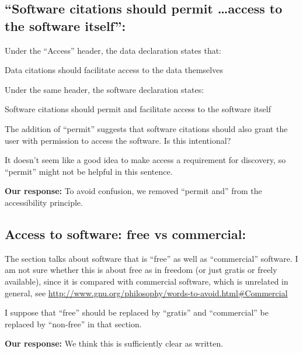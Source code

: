 \documentclass[12pt, oneside]{amsart}
\begin{document}
\subsection{``Software citations should permit \ldots access to the software itself'':} Under the ``Access'' header, the data declaration states that:

\begin{displayquote}
    Data citations should facilitate access to the data themselves
\end{displayquote}

Under the same header, the software declaration states:

\begin{displayquote}
    Software citations should permit and facilitate access to the software itself
\end{displayquote}

The addition of ``permit'' suggests that software citations should also grant the user with permission to access the software. Is this intentional?

It doesn't seem like a good idea to make access a requirement for discovery, so ``permit'' might not be helpful in this sentence.

\textbf{Our response:} To avoid confusion, we removed ``permit and'' from the accessibility principle.

\subsection{Access to software: free vs commercial:} The section talks about software that is ``free'' as well as ``commercial'' software. I am not sure whether this is about free as in freedom (or just gratis or freely available), since it is compared with commercial software, which is unrelated in general, see \url{http://www.gnu.org/philosophy/words-to-avoid.html#Commercial}

I suppose that ``free'' should be replaced by ``gratis'' and ``commercial'' be replaced by ``non-free'' in that section.

\textbf{Our response:} We think this is sufficiently clear as written.




\end{document}
